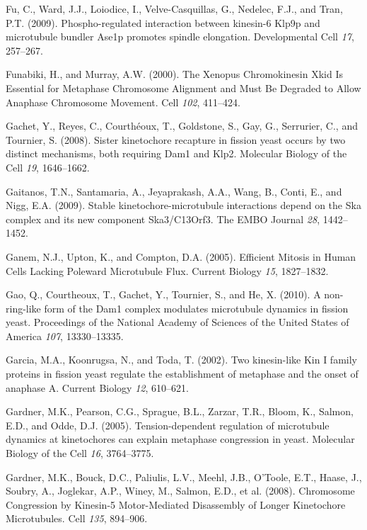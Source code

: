 \documentclass[12pt,a4paper,twoside,openright]{book}
\begin{document}
\hypertarget{ref-Fu2009}{}
Fu, C., Ward, J.J., Loiodice, I., Velve-Casquillas, G., Nedelec, F.J.,
and Tran, P.T. (2009). Phospho-regulated interaction between kinesin-6
Klp9p and microtubule bundler Ase1p promotes spindle elongation.
Developmental Cell \emph{17}, 257--267.

\hypertarget{ref-Funabiki2000}{}
Funabiki, H., and Murray, A.W. (2000). The Xenopus Chromokinesin Xkid Is
Essential for Metaphase Chromosome Alignment and Must Be Degraded to
Allow Anaphase Chromosome Movement. Cell \emph{102}, 411--424.

\hypertarget{ref-Gachet2008a}{}
Gachet, Y., Reyes, C., Courthéoux, T., Goldstone, S., Gay, G.,
Serrurier, C., and Tournier, S. (2008). Sister kinetochore recapture in
fission yeast occurs by two distinct mechanisms, both requiring Dam1 and
Klp2. Molecular Biology of the Cell \emph{19}, 1646--1662.

\hypertarget{ref-Gaitanos2009}{}
Gaitanos, T.N., Santamaria, A., Jeyaprakash, A.A., Wang, B., Conti, E.,
and Nigg, E.A. (2009). Stable kinetochore-microtubule interactions
depend on the Ska complex and its new component Ska3/C13Orf3. The EMBO
Journal \emph{28}, 1442--1452.

\hypertarget{ref-Ganem2005}{}
Ganem, N.J., Upton, K., and Compton, D.A. (2005). Efficient Mitosis in
Human Cells Lacking Poleward Microtubule Flux. Current Biology
\emph{15}, 1827--1832.

\hypertarget{ref-Gao2010}{}
Gao, Q., Courtheoux, T., Gachet, Y., Tournier, S., and He, X. (2010). A
non-ring-like form of the Dam1 complex modulates microtubule dynamics in
fission yeast. Proceedings of the National Academy of Sciences of the
United States of America \emph{107}, 13330--13335.

\hypertarget{ref-Garcia2002d}{}
Garcia, M.A., Koonrugsa, N., and Toda, T. (2002). Two kinesin-like Kin I
family proteins in fission yeast regulate the establishment of metaphase
and the onset of anaphase A. Current Biology \emph{12}, 610--621.

\hypertarget{ref-Gardner2005}{}
Gardner, M.K., Pearson, C.G., Sprague, B.L., Zarzar, T.R., Bloom, K.,
Salmon, E.D., and Odde, D.J. (2005). Tension-dependent regulation of
microtubule dynamics at kinetochores can explain metaphase congression
in yeast. Molecular Biology of the Cell \emph{16}, 3764--3775.

\hypertarget{ref-Gardner2008a}{}
Gardner, M.K., Bouck, D.C., Paliulis, L.V., Meehl, J.B., O'Toole, E.T.,
Haase, J., Soubry, A., Joglekar, A.P., Winey, M., Salmon, E.D., et al.
(2008). Chromosome Congression by Kinesin-5 Motor-Mediated Disassembly
of Longer Kinetochore Microtubules. Cell \emph{135}, 894--906.
\end{document}
